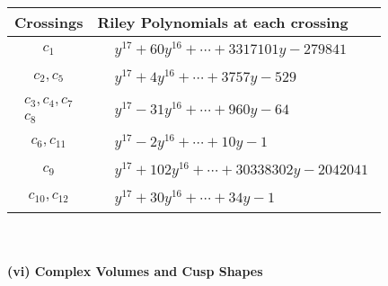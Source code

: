 \documentclass[1p]{elsarticle_modified}
\theoremstyle{definition}
\begin{document}
\begin{tabular}{m{50pt}|m{274pt}}
Crossings & \hspace{64pt}Riley Polynomials at each crossing \\
\hline $$\begin{aligned}c_{1}\end{aligned}$$&$\begin{aligned}
&y^{17}+60 y^{16}+\cdots+3317101 y-279841
\end{aligned}$\\
\hline $$\begin{aligned}c_{2},c_{5}\end{aligned}$$&$\begin{aligned}
&y^{17}+4 y^{16}+\cdots+3757 y-529
\end{aligned}$\\
\hline $$\begin{aligned}c_{3},c_{4},c_{7}\\c_{8}\end{aligned}$$&$\begin{aligned}
&y^{17}-31 y^{16}+\cdots+960 y-64
\end{aligned}$\\
\hline $$\begin{aligned}c_{6},c_{11}\end{aligned}$$&$\begin{aligned}
&y^{17}-2 y^{16}+\cdots+10 y-1
\end{aligned}$\\
\hline $$\begin{aligned}c_{9}\end{aligned}$$&$\begin{aligned}
&y^{17}+102 y^{16}+\cdots+30338302 y-2042041
\end{aligned}$\\
\hline $$\begin{aligned}c_{10},c_{12}\end{aligned}$$&$\begin{aligned}
&y^{17}+30 y^{16}+\cdots+34 y-1
\end{aligned}$\\
\hline
\end{tabular}\\~\\
\newpage\flushleft \textbf{(vi) Complex Volumes and Cusp Shapes}
\end{document}
